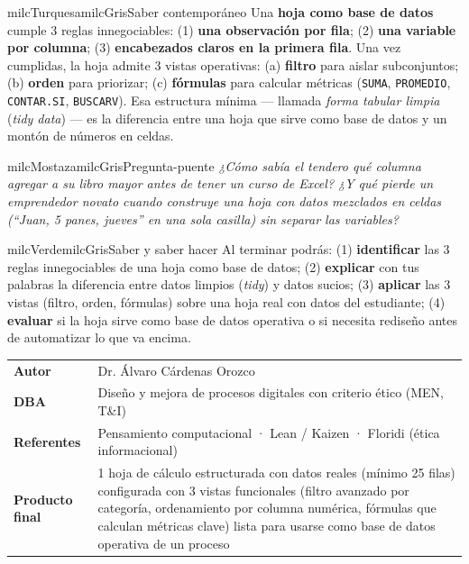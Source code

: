 \documentclass[11pt,letterpaper]{article}
\begin{document}
\begin{softbox}{milcTurquesa}{milcGris}{Saber contemporáneo}
Una \textbf{hoja como base de datos} cumple 3 reglas innegociables: (1) \textbf{una observación por fila}; (2) \textbf{una variable por columna}; (3) \textbf{encabezados claros en la primera fila}. Una vez cumplidas, la hoja admite 3 vistas operativas: (a) \textbf{filtro} para aislar subconjuntos; (b) \textbf{orden} para priorizar; (c) \textbf{fórmulas} para calcular métricas (\texttt{SUMA}, \texttt{PROMEDIO}, \texttt{CONTAR.SI}, \texttt{BUSCARV}). Esa estructura mínima --- llamada \emph{forma tabular limpia} (\emph{tidy data}) --- es la diferencia entre una hoja que sirve como base de datos y un montón de números en celdas.
\end{softbox}

\begin{softbox}{milcMostaza}{milcGris}{Pregunta-puente}
\textit{¿Cómo sabía el tendero qué columna agregar a su libro mayor antes de tener un curso de Excel? ¿Y qué pierde un emprendedor novato cuando construye una hoja con datos mezclados en celdas (\emph{``Juan, 5 panes, jueves''} en una sola casilla) sin separar las variables?}
\end{softbox}

\begin{softbox}{milcVerde}{milcGris}{Saber y saber hacer}
Al terminar podrás: (1) \textbf{identificar} las 3 reglas innegociables de una hoja como base de datos; (2) \textbf{explicar} con tus palabras la diferencia entre datos limpios (\emph{tidy}) y datos sucios; (3) \textbf{aplicar} las 3 vistas (filtro, orden, fórmulas) sobre una hoja real con datos del estudiante; (4) \textbf{evaluar} si la hoja sirve como base de datos operativa o si necesita rediseño antes de automatizar lo que va encima.
\end{softbox}



\small
\begin{tabularx}{\textwidth}{>{\bfseries}p{3.0cm}Y}
Autor & Dr. Álvaro Cárdenas Orozco\\
DBA & Diseño y mejora de procesos digitales con criterio ético (MEN, T\&I)\\
Referentes & Pensamiento computacional · Lean / Kaizen · Floridi (ética informacional)\\
Producto final & 1 hoja de cálculo estructurada con datos reales (mínimo 25 filas) configurada con 3 vistas funcionales (filtro avanzado por categoría, ordenamiento por columna numérica, fórmulas que calculan métricas clave) lista para usarse como base de datos operativa de un proceso\\
\end{tabularx}
\normalsize
\end{document}
